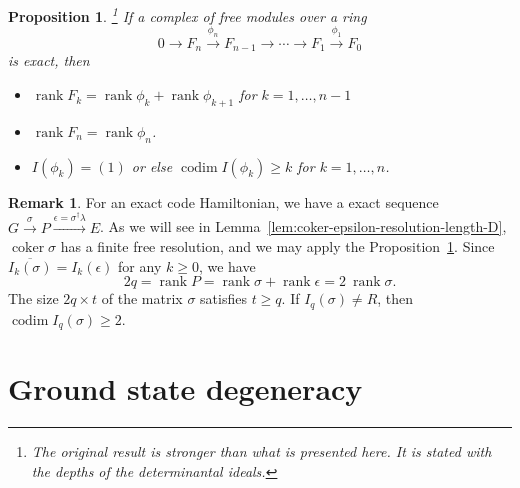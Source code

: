\documentclass[letterpaper,12pt]{amsart}
\newtheorem{prop}[lem]{Proposition}
\theoremstyle{definition} \newtheorem{defn}{Definition}
\theoremstyle{definition} \newtheorem{rem}{Remark}
\theoremstyle{definition} \newtheorem{example}{Example}
\newcommand{\coker}{\mathop{\mathrm{coker}}}
\newcommand{\rank}{\mathop{\mathrm{rank}}}
\newcommand{\codim}{\mathop{\mathrm{codim}}}
\begin{document}
\begin{prop}
\cite{BuchsbaumEisenbud1973Exact}%
\footnote{The original result is stronger than what is presented here.
It is stated with the \emph{depth}s of the determinantal ideals.}
If a complex of free modules over a ring
\[
 0 \to F_n \xrightarrow{\phi_n} F_{n-1} \to \cdots \to F_1 \xrightarrow{\phi_1} F_0
\]
is exact, then
\begin{itemize}
\item $\rank F_k = \rank \phi_k + \rank \phi_{k+1}$ for $k=1,\ldots,n-1$
\item $\rank F_n = \rank \phi_n$.
\item $I(\phi_k)=(1)$ or else $\codim I(\phi_{k}) \ge k$ for $k=1,\ldots,n$.
\end{itemize}
\label{prop:exact-sequence}
\end{prop}

\begin{rem}
For an exact code Hamiltonian,
we have a exact sequence $G \xrightarrow{\sigma} P \xrightarrow{\epsilon=\sigma^\dagger \lambda} E$.
As we will see in Lemma~\ref{lem:coker-epsilon-resolution-length-D},
$\coker \sigma$ has a finite free resolution,
and we may apply the Proposition~\ref{prop:exact-sequence}.
Since $\overline{ I_k(\sigma) } = I_k(\epsilon)$ for any $k \ge 0$, we have
\[
 2q = \rank P = \rank \sigma + \rank \epsilon = 2~ \rank \sigma.
\]
The size $2q \times t$ of the matrix $\sigma$ satisfies $t \ge q$.
If $I_q(\sigma) \ne R$, then $\codim I_q(\sigma) \ge 2$.
\label{rem:rank-sigma-m}
\end{rem}

\section{Ground state degeneracy}
\label{sec:degeneracy}
\end{document}
